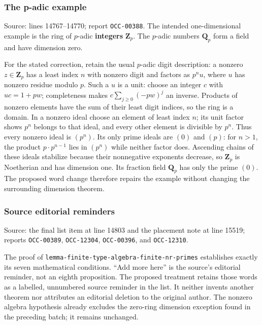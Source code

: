 \subsubsection{The p-adic example}\label{the-p-adic-example}

Source: lines 14767--14770; report \texttt{OCC-00388}. The intended one-dimensional example is the ring of \(p\)-adic \textbf{integers} \(\mathbf Z_p\). The \(p\)-adic numbers \(\mathbf Q_p\) form a field and have dimension zero.

For the stated correction, retain the usual \(p\)-adic digit description: a nonzero \(z\in\mathbf Z_p\) has a least index \(n\) with nonzero digit and factors as \(p^n u\), where \(u\) has nonzero residue modulo \(p\). Such a \(u\) is a unit: choose an integer \(c\) with \(uc=1+pw\); completeness makes \(c\sum_{j\geq0}(-pw)^j\) an inverse. Products of nonzero elements have the sum of their least digit indices, so the ring is a domain. In a nonzero ideal choose an element of least index \(n\); its unit factor shows \(p^n\) belongs to that ideal, and every other element is divisible by \(p^n\). Thus every nonzero ideal is \((p^n)\). Its only prime ideals are \((0)\) and \((p)\): for \(n>1\), the product \(p\cdot p^{n-1}\) lies in \((p^n)\) while neither factor does. Ascending chains of these ideals stabilize because their nonnegative exponents decrease, so \(\mathbf Z_p\) is Noetherian and has dimension one. Its fraction field \(\mathbf Q_p\) has only the prime \((0)\). The proposed word change therefore repairs the example without changing the surrounding dimension theorem.

\subsubsection{Source editorial reminders}\label{source-editorial-reminders}

Source: the final list item at line 14803 and the placement note at line 15519; reports \texttt{OCC-00389}, \texttt{OCC-12304}, \texttt{OCC-00396}, and \texttt{OCC-12310}.

The proof of \texttt{lemma-finite-type-algebra-finite-nr-primes} establishes exactly its seven mathematical conditions. ``Add more here'' is the source's editorial reminder, not an eighth proposition. The proposed treatment retains those words as a labelled, unnumbered source reminder in the list. It neither invents another theorem nor attributes an editorial deletion to the original author. The nonzero algebra hypothesis already excludes the zero-ring dimension exception found in the preceding batch; it remains unchanged.

